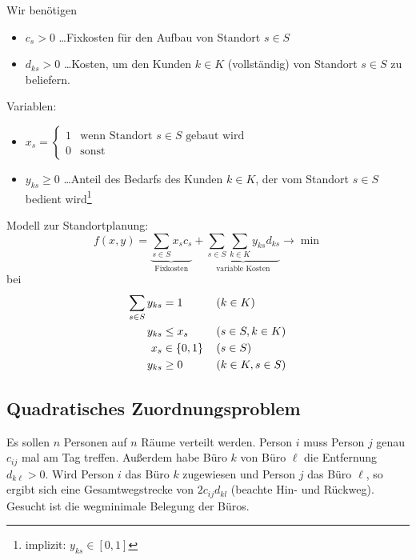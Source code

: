 Wir benötigen
\begin{itemize}[nolistsep, topsep=-\parskip]
	\item $c_s > 0$ \dots Fixkosten für den Aufbau von Standort $s \in S$
	\item $d_{ks} > 0$ \dots Kosten, um den Kunden $k \in K$ (vollständig) von Standort $s \in S$ zu beliefern.
\end{itemize}
\vspace{\parskip}

Variablen:
\begin{itemize}[nolistsep, topsep=-\parskip]
	\item $x_s = \begin{cases} 1 & \text{wenn Standort } s \in S \text{ gebaut wird} \\ 0 & \text{sonst} \end{cases}$ 
	\item $y_{ks} \ge 0$ \dots Anteil des Bedarfs des Kunden $k \in K$, der vom Standort $s \in S$ bedient wird\footnote{implizit: $y_{ks} \in [0,1]$}
\end{itemize}
\vspace{\parskip}

Modell zur Standortplanung:
\begin{equation*}
	f(x,y) = \underbrace{\sum_{s \in S} x_s c_s}_{\text{Fixkosten}}  + \underbrace{\sum_{s \in S} \sum_{k \in K} y_{ks} d_{ks}}_{\text{variable Kosten}} \to \min
\end{equation*}
bei
\begin{equation*}
\begin{alignedat}{2}
	\sum_{s \in S} y_{ks} &= 1 &&(k \in K) \\
	y_{ks} &\le x_s &&(s \in S, k \in K) \\
	x_s &\in \left\{ 0,1 \right\}  & \quad &(s \in S) \\
	y_{ks} &\ge 0\qquad &&(k \in K, s \in S)
\end{alignedat}
\end{equation*}

\subsection{Quadratisches Zuordnungsproblem}
\label{subsec: 1.3.4}

Es sollen $n$ Personen auf $n$ Räume verteilt werden. Person $i$ muss Person $j$ genau $c_{ij}$ mal am Tag treffen. Außerdem habe Büro $k$ von Büro $\ell$ die Entfernung $d_{k \ell}>0$. Wird Person $i$ das Büro $k$ zugewiesen und Person $j$ das Büro $\ell$, so ergibt sich eine Gesamtwegstrecke von $2 c_{ij} d_{kl}$ (beachte Hin- und Rückweg). Gesucht ist die wegminimale Belegung der Büros.

